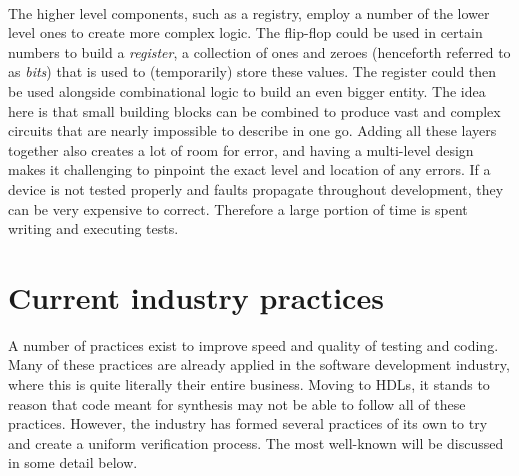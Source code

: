 \documentclass[11pt,british]{article}
\begin{document}
\\[\baselineskip]
The higher level components, such as a registry, employ a number of the lower level ones to create more complex logic.\cite{vhdlsynth3} The flip-flop could be used in certain numbers to build a \emph{register}, a collection of ones and zeroes (henceforth referred to as \emph{bits}) that is used to (temporarily) store these values. The register could then be used alongside combinational logic to build an even bigger entity. The idea here is that small building blocks can be combined to produce vast and complex circuits that are nearly impossible to describe in one go.\cite{vhdlhierarchy} Adding all these layers together also creates a lot of room for error, and having a multi-level design makes it challenging to pinpoint the exact level and location of any errors. If a device is not tested properly and faults propagate throughout development, they can be very expensive to correct.\cite{weber06} Therefore a large portion of time is spent writing and executing tests. 


\newpage

\section{Current industry practices}
\label{sec:industry}
A number of practices exist to improve speed and quality of testing and coding. Many of these practices are already applied in the software development industry, where this is quite literally their entire business. Moving to \gls{HDL}s, it stands to reason that code meant for synthesis may not be able to follow all of these practices. However, the industry has formed several practices of its own to try and create a uniform verification process. The most well-known will be discussed in some detail below.
\end{document}

